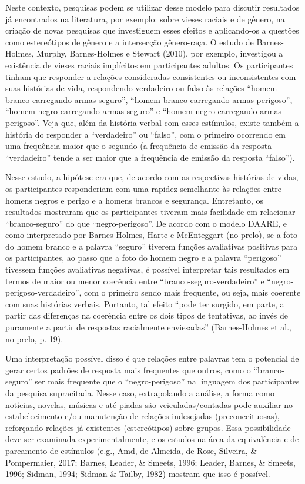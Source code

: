 Neste contexto, pesquisas podem se utilizar desse modelo para discutir resultados já encontrados na literatura, por exemplo: sobre vieses raciais e de gênero, na criação de novas pesquisas que investiguem esses efeitos e aplicando-os a questões como estereótipos de gênero e a intersecção gênero-raça. O estudo de Barnes-Holmes, Murphy, Barnes-Holmes e Stewart (2010), por exemplo, investigou a existência de vieses raciais implícitos em participantes adultos. Os participantes tinham que responder a relações consideradas consistentes ou inconsistentes com suas histórias de vida, respondendo verdadeiro ou falso às relações ``homem branco carregando armas-seguro'', ``homem branco carregando armas-perigoso'', ``homem negro carregando armas-seguro'' e ``homem negro carregando armas-perigoso''. Veja que, além da história verbal com esses estímulos, existe também a história do responder a ``verdadeiro'' ou ``falso'', com o primeiro ocorrendo em uma frequência maior que o segundo (a frequência de emissão da resposta ``verdadeiro'' tende a ser maior que a frequência de emissão da resposta ``falso''). 

Nesse estudo, a hipótese era que, de acordo com as respectivas histórias de vidas, os participantes responderiam com uma rapidez semelhante às relações entre homens negros e perigo e a homens brancos e segurança. Entretanto, os resultados mostraram que os participantes tiveram mais facilidade em relacionar ``branco-seguro'' do que ``negro-perigoso''. De acordo com o modelo DAARE, e como interpretado por Barnes-Holmes, Harte e McEnteggart (no prelo), se a foto do homem branco e a palavra ``seguro'' tiverem funções avaliativas positivas para os participantes, ao passo que a foto do homem negro e a palavra ``perigoso'' tivessem funções avaliativas negativas, é possível interpretar tais resultados em termos de maior ou menor coerência entre ``branco-seguro-verdadeiro'' e ``negro-perigoso-verdadeiro'', com o primeiro sendo mais frequente, ou seja, mais coerente com suas histórias verbais. Portanto, tal efeito ``pode ter surgido, em parte, a partir das diferenças na coerência entre os dois tipos de tentativas, ao invés de puramente a partir de respostas racialmente enviesadas'' (Barnes-Holmes et al., no prelo, p. 19).

Uma interpretação possível disso é que relações entre palavras tem o potencial de gerar certos padrões de resposta mais frequentes que outros, como o ``branco-seguro'' ser mais frequente que o ``negro-perigoso'' na linguagem dos participantes da pesquisa supracitada. Nesse caso, extrapolando a análise, a forma como notícias, novelas, músicas e até piadas são veiculadas/contadas pode auxiliar no estabelecimento e/ou manutenção de relações indesejadas (preconceituosas), reforçando relações já existentes (estereótipos) sobre grupos. Essa possibilidade deve ser examinada experimentalmente, e os estudos na área da equivalência e de pareamento de estímulos (e.g., Amd, de Almeida, de Rose, Silveira, \& Pompermaier, 2017; Barnes, Leader, \& Smeets, 1996; Leader, Barnes, \& Smeets, 1996; Sidman, 1994; Sidman \& Tailby, 1982) mostram que isso é possível.

